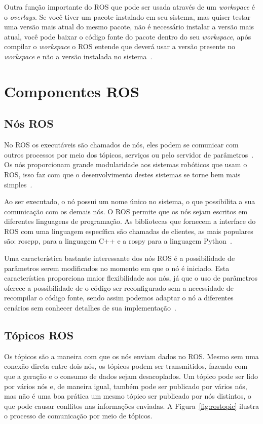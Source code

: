 Outra função importante do ROS que pode ser usada através de um \textit{workspace} é o \textit{overlays}. Se você tiver um pacote instalado em seu sistema, mas quiser testar uma versão mais atual do mesmo pacote, não é necessário instalar a versão mais atual, você pode baixar o código fonte do pacote dentro do seu \textit{workspace}, após compilar o \textit{workspace} o ROS entende que deverá usar a versão presente no \textit{workspace} e não a versão instalada no sistema~\cite{rosEfetiveProgram}.


\section{Componentes ROS}

\subsection{Nós ROS}
No ROS os executáveis são chamados de nós, eles podem se comunicar com outros processos por meio dos tópicos, serviços ou pelo servidor de parâmetros~\cite{rosEfetiveProgram}. Os nós proporcionam grande modularidade aos sistemas robóticos que usam o ROS, isso faz com que o desenvolvimento destes sistemas se torne bem mais simples~\cite{RosNode}.

Ao ser executado, o nó possui um nome único no sistema, o que possibilita a sua comunicação com os demais nós. O ROS permite que os nós sejam escritos em diferentes linguagens de programação. As bibliotecas que fornecem a interface do ROS com uma linguagem específica são chamadas de clientes, as mais populares são: roscpp, para a linguagem C++ e a rospy para a linguagem Python~\cite{rosLearning}.

Uma característica bastante interessante dos nós ROS é a possibilidade de parâmetros serem modificados no momento em que o nó é iniciado. Esta característica proporciona maior flexibilidade aos nós, já que o uso de parâmetros oferece a possibilidade de o código ser reconfigurado sem a necessidade de recompilar o código fonte, sendo assim podemos adaptar o nó a diferentes cenários sem conhecer detalhes de sua implementação~\cite{rosLearning}. 


\subsection{Tópicos ROS}

Os tópicos são a maneira com que os nós enviam dados no ROS\@. Mesmo sem uma conexão direta entre dois nós, os tópicos podem ser transmitidos, fazendo com que a geração e o consumo de dados sejam desacoplados. Um tópico pode ser lido por vários nós e, de maneira igual, também pode ser publicado por vários nós, mas não é uma boa prática um mesmo tópico ser publicado por nós distintos, o que pode causar conflitos nas informações enviadas. A Figura~\ref{fig:rostopic} ilustra o processo de comunicação por meio de tópicos.

